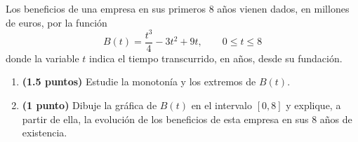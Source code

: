 
Los beneficios de una empresa en sus primeros 8 años vienen dados, en millones de euros, por la función
\[
B(t)=\frac{t^3}{4}-3t^2+9t,\qquad0\leq t\leq8
\]
donde la variable $t$ indica el tiempo transcurrido, en años, desde su fundación.
\begin{enumerate}[label=\alph*)]
\item \textbf{(1.5 puntos)} Estudie la monotonía y los extremos de $B(t)$.
\item \textbf{(1 punto)} Dibuje la gráfica de $B(t)$ en el intervalo $[0,8]$ y explique, a partir de ella, la evolución de los beneficios de esta empresa en sus 8 años de existencia.
\end{enumerate}
